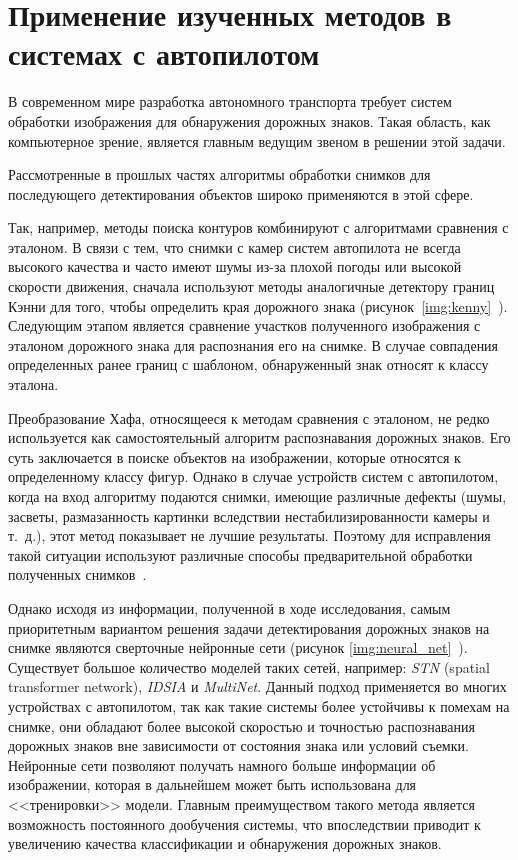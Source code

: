 \chapter{Применение изученных методов в системах с автопилотом}

В современном мире разработка автономного транспорта требует систем обработки изображения для обнаружения дорожных знаков. Такая область, как компьютерное зрение, является главным ведущим звеном в решении этой задачи.

 Рассмотренные в прошлых частях алгоритмы обработки снимков для последующего детектирования объектов широко применяются в этой сфере.
 
 Так, например, методы поиска контуров комбинируют с алгоритмами сравнения с эталоном. В связи с тем, что снимки с камер систем автопилота не всегда высокого качества и часто имеют шумы из-за плохой погоды или высокой скорости движения, сначала используют методы аналогичные детектору границ Кэнни для того, чтобы определить края дорожного знака (рисунок~\ref{img:kenny}~\cite{znak_cv}). Следующим этапом является сравнение участков полученного изображения с эталоном дорожного знака для распознания его на снимке. В случае совпадения определенных ранее границ с шаблоном, обнаруженный знак относят к классу эталона.

Преобразование Хафа, относящееся к методам сравнения с эталоном, не редко используется как самостоятельный алгоритм распознавания дорожных знаков. Его суть заключается в поиске объектов на изображении, которые относятся к определенному классу фигур. Однако в случае устройств систем с автопилотом, когда на вход алгоритму подаются снимки, имеющие различные дефекты (шумы, засветы, размазанность картинки вследствии нестабилизированности камеры и т.~д.), этот метод показывает не лучшие результаты. Поэтому для исправления такой ситуации используют различные способы предварительной обработки полученных снимков~\cite{some_inf}.
 
Однако исходя из информации, полученной в ходе исследования, самым приоритетным вариантом решения задачи детектирования дорожных знаков на снимке являются сверточные нейронные сети (рисунок \ref{img:neural_net}~\cite{neural_struct}). Существует большое количество моделей таких сетей, например: \textit{STN} (spatial transformer network), \textit{IDSIA} и \textit{MultiNet}. Данный подход применяется во многих устройствах с автопилотом, так как такие системы более устойчивы к помехам на снимке, они обладают более высокой скоростью и точностью распознавания дорожных знаков вне зависимости от состояния знака или условий съемки. Нейронные сети позволяют получать намного больше информации об изображении, которая в дальнейшем может быть использована для <<тренировки>> модели. Главным преимуществом такого метода является возможность постоянного дообучения системы, что впоследствии приводит к увеличению качества классификации и обнаружения дорожных знаков.

